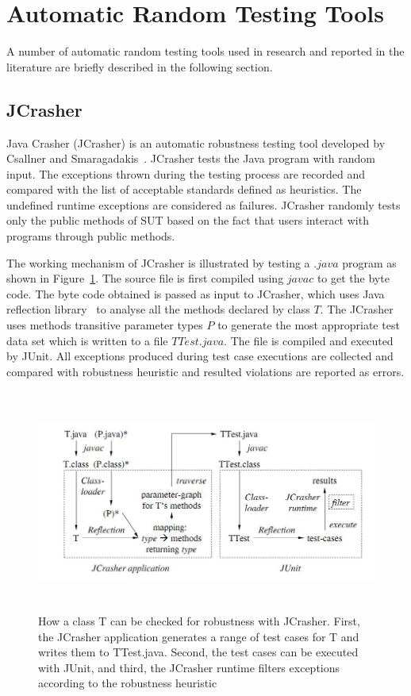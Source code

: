 \section{Automatic Random Testing Tools}
A number of automatic random testing tools used in research and reported in the literature are briefly described in the following section.


\subsection{JCrasher}
Java Crasher (JCrasher) is an automatic robustness testing tool developed by Csallner and Smaragadakis~\cite{csallner2004jcrasher}. JCrasher tests the Java program with random input. The exceptions thrown during the testing process are recorded and compared with the list of acceptable standards defined as heuristics. The undefined runtime exceptions are considered as failures. JCrasher randomly tests only the public methods of SUT based on the fact that users interact with programs through public methods.

The working mechanism of JCrasher is illustrated by testing a $.java$ program as shown in Figure~\ref{fig:JCrasher}. The source file is first compiled using $javac$ to get the byte code. The byte code obtained is passed as input to JCrasher, which uses Java reflection library~\cite{chan1999java} to analyse all the methods declared by class $T$. The JCrasher uses methods transitive parameter types $P$ to generate the most appropriate test data set which is written to a file $TTest.java$. The file is compiled and executed by JUnit. All exceptions produced during test case executions are collected and compared with robustness heuristic and resulted violations are reported as errors.
\bigskip
\bigskip
\begin{figure}[h]
	\centering
	\includegraphics[width=15cm, height=7.3cm]{chapter2/JCrasher.png}
	\bigskip
	\caption{How a class T can be checked for robustness with JCrasher. First, the JCrasher application generates a range of test cases for T and writes them to TTest.java. Second, the test cases can be executed with JUnit, and third, the JCrasher runtime filters exceptions according to the robustness heuristic~\cite{csallner2004jcrasher}}
	\label{fig:JCrasher}
\end{figure}
\bigskip

